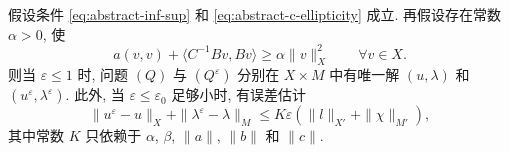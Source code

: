 \setcounter{statement}{2}
\begin{Theorem}\label{thm:abstract-penalty-error}
假设条件 
\eqref{eq:abstract-inf-sup} 和
\eqref{eq:abstract-c-ellipticity} 成立. 再假设存在常数 $\alpha>0$, 使
\begin{equation}\label{eq:abstract-combined-ellipticity}
a(v,v)+\langle C^{-1}Bv,Bv\rangle
\ge\alpha\|v\|_X^2
\qquad\forall v\in X.
\end{equation}
则当 $\varepsilon\le1$ 时, 问题 $(Q)$ 与 $(Q^\varepsilon)$ 分别在
$X\times M$ 中有唯一解 $(u,\lambda)$ 和
$(u^\varepsilon,\lambda^\varepsilon)$. 此外, 当
$\varepsilon\le\varepsilon_0$ 足够小时, 有误差估计
\begin{equation}\label{eq:abstract-penalty-error-bound}
\|u^\varepsilon-u\|_X+\|\lambda^\varepsilon-\lambda\|_M
\le K\varepsilon(\|l\|_{X'}+\|\chi\|_{M'}),
\end{equation}
其中常数 $K$ 只依赖于 $\alpha$, $\beta$, $\|a\|$, $\|b\|$ 和 $\|c\|$.
\end{Theorem}

